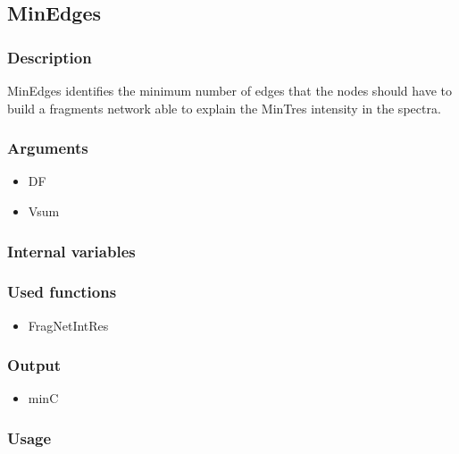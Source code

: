 \subsection{MinEdges}
\subsubsection{Description}
MinEdges identifies the minimum number of edges that the nodes should have to build a fragments network able to explain the MinTres intensity in the spectra.
\subsubsection{Arguments}
\begin{itemize}
\item DF
\item Vsum
\end{itemize}
\subsubsection{Internal variables}
\subsubsection{Used functions}
\begin{itemize}
\item FragNetIntRes
\end{itemize}
\subsubsection{Output}
\begin{itemize}
\item minC
\end{itemize}
\subsubsection{Usage}

